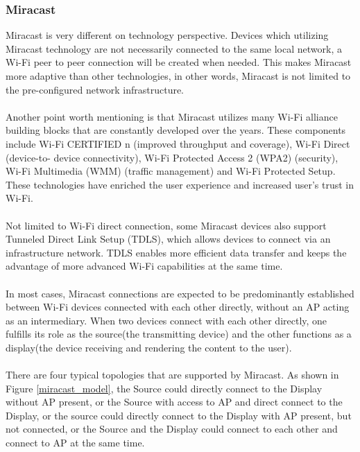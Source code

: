 \subsubsection{Miracast\label{2_2_5}} %
Miracast \cite{miracast_industry} is very different on technology perspective.
Devices which utilizing Miracast technology are not necessarily connected to
the same local network, a Wi-Fi peer to peer connection will be created when
needed. This makes Miracast more adaptive than other technologies, in other
words, Miracast is not limited to the pre-configured network infrastructure.\\
\\
Another point worth mentioning is that Miracast utilizes many Wi-Fi alliance
building blocks that are constantly developed over the years. These components
include Wi-Fi CERTIFIED n (improved throughput and coverage), Wi-Fi Direct
(device-to- device connectivity), Wi-Fi Protected Access 2 (WPA2) (security),
Wi-Fi Multimedia (WMM) (traffic management) and Wi-Fi Protected Setup. These
technologies have enriched the user experience and increased user's trust in
Wi-Fi.\\
\\
Not limited to Wi-Fi direct connection, some Miracast devices also support Tunneled Direct Link Setup (TDLS), which allows devices to connect via an infrastructure network. TDLS enables more efficient data transfer and keeps the advantage of more advanced Wi-Fi capabilities at the same time.\\
\\
In most cases, Miracast connections are expected to be predominantly established between Wi-Fi devices connected with each other directly, without an AP acting as an intermediary. When two devices connect with each other directly, one fulfills its role as the source(the transmitting device) and the other functions as a display(the device receiving and rendering the content to the user).\\
\\
There are four typical topologies that are supported by Miracast. As shown in
Figure \ref{miracast_model}, the Source could directly connect to the Display
without AP present, or the Source with access to AP and direct connect to the Display, or the source could directly
connect to the Display with AP present, but not connected, or the Source and
the Display could connect to each other and connect to AP at the same time.\\
